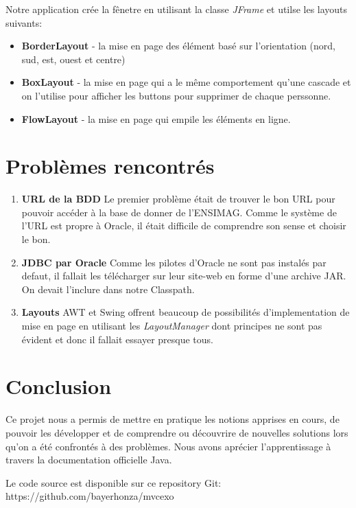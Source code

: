 \documentclass[10pt]{article}
\begin{document}
Notre application crée la fênetre en utilisant la classe \textit{JFrame} et utilse les layouts suivants:
\begin{itemize}
    \item \textbf{BorderLayout} - la mise en page des élément basé sur l'orientation (nord, sud, est, ouest et centre)
    \item \textbf{BoxLayout} - la mise en page qui a le même comportement qu'une cascade et on l'utilise pour afficher les buttons pour supprimer de chaque perssonne. 
    \item \textbf{FlowLayout} - la mise en page qui empile les éléments en ligne.
\end{itemize}

\section{Problèmes rencontrés}
\begin{enumerate}
    \item \textbf{URL de la BDD} Le premier problème était de trouver le bon URL pour pouvoir accéder à la base de donner de l'ENSIMAG. Comme le système de l'URL est propre à Oracle, il était difficile de comprendre son sense et choisir le bon.
    \item \textbf{JDBC par Oracle} Comme les pilotes d'Oracle ne sont pas instalés par defaut, il fallait les télécharger sur leur site-web en forme d'une archive JAR. On devait l'inclure dans notre Classpath.
    \item \textbf{Layouts} AWT et Swing offrent beaucoup de possibilités d'implementation de mise en page en utilisant les \textit{LayoutManager} dont principes ne sont pas évident et donc il fallait essayer presque tous.
\end{enumerate}
\section{Conclusion}
Ce projet nous a permis de mettre en pratique les notions apprises en cours, de pouvoir les développer et de comprendre ou découvrire de nouvelles solutions lors qu'on a été confrontés à des problèmes. Nous avons aprécier l'apprentissage à travers la documentation officielle Java. 

Le code source est disponible sur ce repository Git: https://github.com/bayerhonza/mvcexo  
\newpage
\printbibliography
\end{document}

